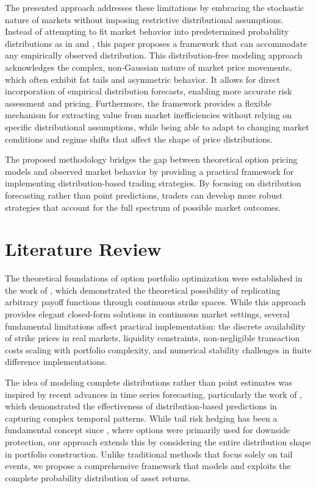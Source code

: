 \documentclass[12pt]{article}
\begin{document}
The presented approach addresses these limitations by embracing the stochastic nature of markets
without imposing restrictive distributional assumptions. Instead of attempting to fit
market behavior into predetermined probability distributions as in \citep{Kuang2023} and 
\citep{Li2023}, this paper proposes a framework that can accommodate any empirically 
observed distribution. This distribution-free modeling approach acknowledges the complex, 
non-Gaussian nature of market price movements, which often exhibit fat tails and 
asymmetric behavior. It allows for direct incorporation of empirical distribution forecasts, 
enabling more accurate risk assessment and pricing.
Furthermore, the framework provides a flexible mechanism for extracting value from market
inefficiencies without relying on specific distributional assumptions, while being able
to adapt to changing market conditions and regime shifts that affect the shape of price
distributions.

The proposed methodology bridges the gap between theoretical option pricing models
and observed market behavior by providing a practical framework for implementing
distribution-based trading strategies. By focusing on distribution forecasting
rather than point predictions, traders can develop more robust strategies that
account for the full spectrum of possible market outcomes.

\section{Literature Review}
The theoretical foundations of option portfolio optimization were established in the work of 
\citep{Carr01012001}, which demonstrated the theoretical possibility of replicating 
arbitrary payoff functions through continuous strike spaces. While this approach 
provides elegant closed-form solutions in continuous market settings, several fundamental 
limitations affect practical implementation: the discrete availability of strike prices 
in real markets, liquidity constraints, non-negligible transaction costs scaling with 
portfolio complexity, and numerical stability challenges in finite difference implementations. 

The idea of modeling complete distributions rather than point estimates was inspired by recent 
advances in time series forecasting, particularly the work of \citep{ansari2024chronos}, which 
demonstrated the effectiveness of distribution-based predictions in capturing complex temporal 
patterns. While tail risk hedging has been a fundamental concept since \citep{BlackScholes1973}, 
where options were primarily used for downside protection, our approach extends this by 
considering the entire distribution shape in portfolio construction. Unlike traditional methods 
that focus solely on tail events, we propose a comprehensive framework that models and exploits 
the complete probability distribution of asset returns.
\end{document}
